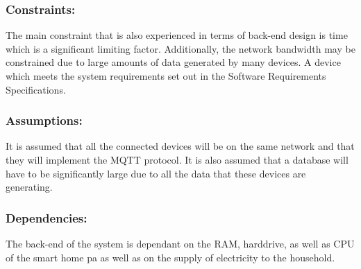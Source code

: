 \documentclass[10pt,twocolumn]{witseiepaper}
\begin{document}
	
	\subsubsection{Constraints:}
	The main constraint that is also experienced in terms of back-end design is time which is a significant limiting factor. Additionally, the network bandwidth may be constrained due to large amounts of data generated by many devices. 
	A device which meets the system requirements set out in the Software Requirements Specifications. 
	\subsubsection{Assumptions:}
	It is assumed that all the connected devices will be on the same network and that they will implement the MQTT protocol. It is also assumed that a database will have to be significantly large due to all the data that these devices are generating. 
	\subsubsection{Dependencies:}
	The back-end of the system is dependant on the RAM, harddrive, as well as CPU of the smart home pa as well as on the supply of electricity to the household. 

	
\end{document}
